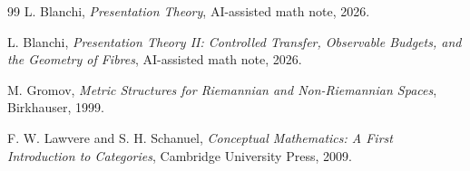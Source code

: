 \documentclass[11pt]{article}
\begin{document}
\begin{thebibliography}{99}
L. Blanchi, \emph{Presentation Theory}, AI-assisted math note, 2026.

L. Blanchi, \emph{Presentation Theory II: Controlled Transfer, Observable Budgets, and the Geometry of Fibres}, AI-assisted math note, 2026.

M. Gromov, \emph{Metric Structures for Riemannian and Non-Riemannian Spaces}, Birkhauser, 1999.

F. W. Lawvere and S. H. Schanuel, \emph{Conceptual Mathematics: A First Introduction to Categories}, Cambridge University Press, 2009.
\end{thebibliography}
\end{document}

